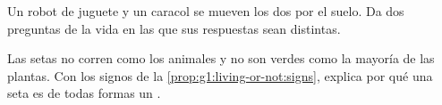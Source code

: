 \begin{exercise}[$\star\star$]\label{exo:g1:living-or-not:9}
Un robot de juguete y un caracol se mueven los dos por el suelo. Da
dos preguntas de la vida en las que sus respuestas sean distintas.
\end{exercise}

\begin{exercise}[$\star\star$]\label{exo:g1:living-or-not:10}
Las setas no corren como los animales y no son verdes como la mayoría
de las plantas. Con los signos de la
\cref{prop:g1:living-or-not:signs}, explica por qué una seta es de
todas formas un .
\end{exercise}
